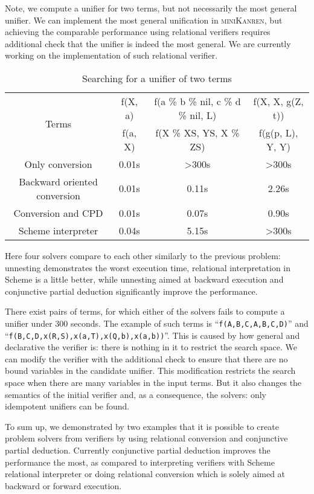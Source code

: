 Note, we compute a unifier for two terms, but not necessarily the most general unifier. 
We can implement the most general unification in \textsc{miniKanren}, but achieving the comparable performance using 
relational verifiers requires additional check that the unifier is indeed the most general. 
We are currently working on the implementation of such relational verifier. 

\begin{table}
\centering
\begin{tabular}{c|c|c|c}
\multirow{ 2}{*}{Terms} & 
f(X, a) & f(a \% b \% nil, c \% d \% nil, L) & f(X, X, g(Z, t))  \\
\cline{2-4} &
f(a, X) & f(X \% XS, YS, X \% ZS) & f(g(p, L), Y, Y)  \\
\hline\hline
Only conversion               & 0.01s  &  >300s & >300s \\
\hline
Backward oriented conversion  & 0.01s  &  0.11s & 2.26s  \\
\hline
Conversion and CPD            & 0.01s  &  0.07s & 0.90s  \\
\hline

Scheme interpreter            & 0.04s  & 5.15s & >300s    \\
\end{tabular}
 \caption{Searching for a unifier of two terms}
    \label{tab:uni}
\end{table}

Here four solvers compare to each other similarly to the previous problem: unnesting demonstrates the worst execution time, relational interpretation in Scheme is a little better, while unnesting aimed at backward execution and conjunctive partial deduction significantly improve the performance. 

There exist pairs of terms, for which either of the solvers fails to compute a unifier under 300 seconds. 
The example of such terms is ``\lstinline{f(A,B,C,A,B,C,D)}'' and ``\lstinline{f(B,C,D,x(R,S),x(a,T),x(Q,b),x(a,b))}''. 
This is caused by how general and declarative the verifier is: there is nothing in it to restrict the search space. 
We can modify the verifier with the additional check to ensure that there are no bound variables in the candidate unifier. 
This modification restricts the search space when there are many variables in the input terms.
But it also changes the semantics of the initial verifier and, as a consequence, the solvers: only idempotent unifiers can be found. 

To sum up, we demonstrated by two examples that it is possible to create problem solvers from verifiers by using relational conversion 
and conjunctive partial deduction. Currently conjunctive partial deduction improves the performance the most, as compared to 
interpreting verifiers with Scheme relational interpreter or doing relational conversion which is solely aimed at backward or 
forward execution.
